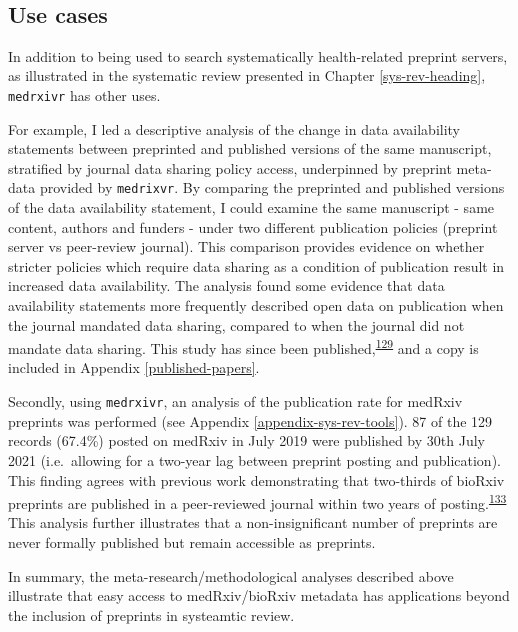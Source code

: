 \documentclass[a4paper, twoside]{templates/ociamthesis}
\begin{document}
~

\hypertarget{use-cases}{%
\subsection{Use cases}\label{use-cases}}

In addition to being used to search systematically health-related preprint servers, as illustrated in the systematic review presented in Chapter \ref{sys-rev-heading}, \texttt{medrxivr} has other uses.

For example, I led a descriptive analysis of the change in data availability statements between preprinted and published versions of the same manuscript, stratified by journal data sharing policy access, underpinned by preprint meta-data provided by \texttt{medrixvr}. By comparing the preprinted and published versions of the data availability statement, I could examine the same manuscript - same content, authors and funders - under two different publication policies (preprint server vs peer-review journal). This comparison provides evidence on whether stricter policies which require data sharing as a condition of publication result in increased data availability. The analysis found some evidence that data availability statements more frequently described open data on publication when the journal mandated data sharing, compared to when the journal did not mandate data sharing. This study has since been published,\textsuperscript{\protect\hyperlink{ref-mcguinness2020DAScomparison}{129}} and a copy is included in Appendix \ref{published-papers}.

Secondly, using \texttt{medrxivr}, an analysis of the publication rate for medRxiv preprints was performed (see Appendix \ref{appendix-sys-rev-tools}). 87 of the 129 records (67.4\%) posted on medRxiv in July 2019 were published by 30th July 2021 (i.e.~allowing for a two-year lag between preprint posting and publication). This finding agrees with previous work demonstrating that two-thirds of bioRxiv preprints are published in a peer-reviewed journal within two years of posting.\textsuperscript{\protect\hyperlink{ref-abdill2019popularity}{133}} This analysis further illustrates that a non-insignificant number of preprints are never formally published but remain accessible as preprints.

In summary, the meta-research/methodological analyses described above illustrate that easy access to medRxiv/bioRxiv metadata has applications beyond the inclusion of preprints in systeamtic review.
\end{document}

